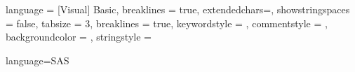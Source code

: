 
\usepackage{listings}


{
	language = {[Visual] Basic},	
	breaklines = true,
	extendedchars=\true,
	showstringspaces = false,	
	tabsize = 3,
	breaklines = true,
	keywordstyle = \color{blue},
	commentstyle = \color{green!35!black},
	backgroundcolor = \color{gray!20!white},
	stringstyle = \color{red}
}


{
	language=SAS
}


